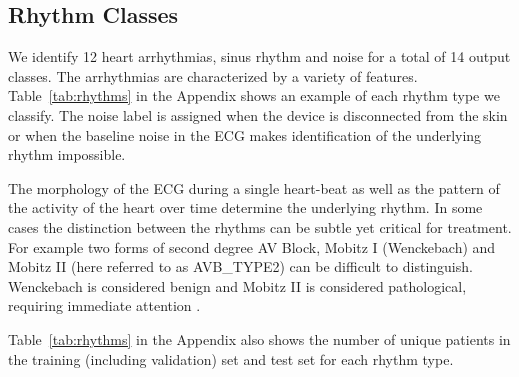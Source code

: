 \documentclass{article}
\begin{document}
\subsection*{Rhythm Classes}
We identify 12 heart arrhythmias, sinus rhythm and noise for a total of 14 output classes. The arrhythmias are characterized by a variety of features. Table~\ref{tab:rhythms} in the Appendix shows an example of each rhythm type we classify. The noise label is assigned when the device is disconnected from the skin or when the baseline noise in the ECG makes identification of the underlying rhythm impossible.

The morphology of the ECG during a single heart-beat as well as the pattern of the activity of the heart over time determine the underlying rhythm. In some cases the distinction between the rhythms can be subtle yet critical for treatment. For example two forms of second degree AV Block, Mobitz I (Wenckebach) and Mobitz II (here referred to as AVB\_TYPE2) can be difficult to distinguish. Wenckebach is considered benign and Mobitz II is considered pathological, requiring immediate attention \cite{dubin1996rapid}. 

Table~\ref{tab:rhythms} in the Appendix also shows the number of unique patients in the training (including validation) set and test set for each rhythm type.
\end{document}

